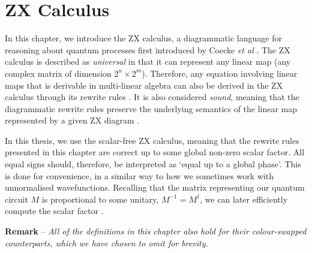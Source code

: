 \chapter{ZX Calculus}%
\label{zx-calculus}

In this chapter, we introduce the ZX calculus, a diagrammatic language for reasoning about quantum processes first introduced by Coecke \textit{et al} \cite{Coecke2011}. The ZX calculus is described as \textit{universal} in that it can represent any linear map (any complex matrix of dimension $2^n \times 2^m$). Therefore, any equation involving linear maps that is derivable in multi-linear algebra can also be derived in the ZX calculus through its rewrite rules \cite{Poor2023}. It is also considered \textit{sound}, meaning that the diagrammatic rewrite rules preserve the underlying semantics of the linear map represented by a given ZX diagram \cite{Wetering2020}.

In this thesis, we use the scalar-free ZX calculus, meaning that the rewrite rules presented in this chapter are correct up to some global non-zero scalar factor. All equal signs should, therefore, be interpreted as `equal up to a global phase'. This is done for convenience, in a similar way to how we sometimes work with unnormalised wavefunctions. Recalling that the matrix representing our quantum circuit $M$ is proportional to some unitary, $M^{-1} = M^\dagger$, we can later efficiently compute the scalar factor \cite{Wetering2020}.

\hangindent=10pt 
\textbf{Remark} -- \textit{All of the definitions in this chapter also hold for their colour-swapped counterparts, which we have chosen to omit for brevity.}

